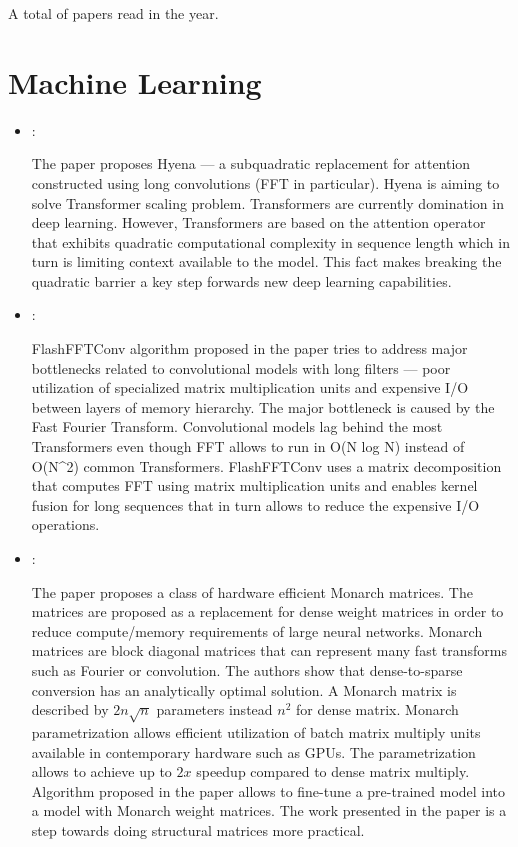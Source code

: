 



A total of  papers read in the year.


\section*{Machine Learning}
\begin{itemize}
    \item \cite{Poli:Hyena:2023}:

    The paper proposes Hyena --- a subquadratic replacement for attention constructed using long convolutions (FFT in particular). Hyena is aiming to solve Transformer scaling problem. Transformers are currently domination in deep learning. However, Transformers are based on the attention operator that exhibits quadratic computational complexity in sequence length which in turn is limiting context available to the model. This fact makes breaking the quadratic barrier a key step forwards new deep learning capabilities.

    \item \cite{Fu:FlashFFTConv:2024}:

    FlashFFTConv algorithm proposed in the paper tries to address major bottlenecks related to convolutional models with long filters --- poor utilization of specialized matrix multiplication units and expensive I/O between layers of memory hierarchy. The major bottleneck is caused by the Fast Fourier Transform. Convolutional models lag behind the most Transformers even though FFT allows to run in O(N log N) instead of  O(N^2) common Transformers. FlashFFTConv uses a matrix decomposition that computes FFT using matrix multiplication units and enables kernel fusion for long sequences that in turn allows to reduce the expensive I/O operations.

    \item \cite{Dao:Monarch:2022}:

    The paper proposes a class of hardware efficient Monarch matrices. The matrices are proposed as a replacement for dense weight matrices in order to reduce compute/memory requirements of large neural networks. Monarch matrices are block diagonal matrices that can represent many fast transforms such as Fourier or convolution. The authors show that dense-to-sparse conversion has an analytically optimal solution. A Monarch matrix is described by $2n\sqrt{n}$ parameters instead $n^2$ for dense matrix. Monarch parametrization allows efficient utilization of batch matrix multiply units available in contemporary hardware such as GPUs. The parametrization allows to achieve up to $2x$ speedup compared to dense matrix multiply. Algorithm proposed in the paper allows to fine-tune a pre-trained model into a model with Monarch weight matrices. The work presented in the paper is a step towards doing structural matrices more practical.


\end{itemize}
